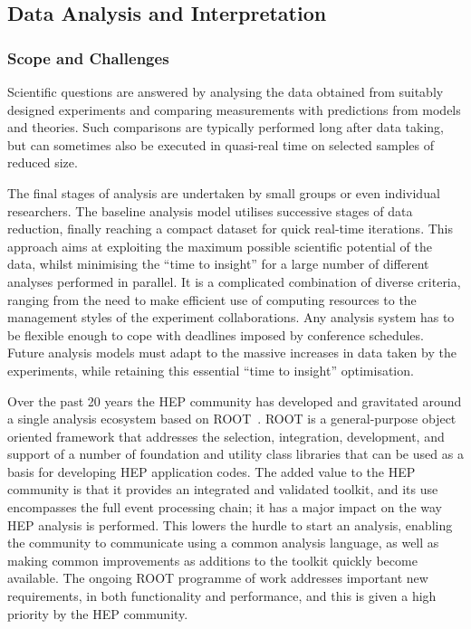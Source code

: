 \documentclass[12pt,a4paper]{article}
\begin{document}
\hypertarget{data-analysis-and-interpretation}{%
\subsection{Data Analysis and
Interpretation}\label{data-analysis-and-interpretation}}

\subsubsection*{Scope and Challenges}

Scientific questions are answered by analysing the data obtained from
suitably designed experiments and comparing measurements with
predictions from models and theories. Such comparisons are typically
performed long after data taking, but can sometimes also be executed in
quasi-real time on selected samples of reduced size.

The final stages of analysis are undertaken by small groups or even
individual researchers. The baseline analysis model utilises successive
stages of data reduction, finally reaching a compact dataset for quick
real-time iterations. This approach aims at exploiting the maximum
possible scientific potential of the data, whilst minimising the ``time
to insight'' for a large number of different analyses performed in
parallel. It is a complicated combination of diverse criteria, ranging
from the need to make efficient use of computing resources to the
management styles of the experiment collaborations. Any analysis system
has to be flexible enough to cope with deadlines imposed by conference
schedules. Future analysis models must adapt to the massive increases in
data taken by the experiments, while retaining this essential ``time to
insight'' optimisation.

Over the past 20 years the HEP community has developed and gravitated
around a single analysis ecosystem based on ROOT~\cite{Brun1996}. 
ROOT is a general-purpose object
oriented framework that addresses the selection, integration,
development, and support of a number of foundation and utility class
libraries that can be used as a basis for developing HEP application
codes. The added value to the HEP community is that it provides an
integrated and validated toolkit, and its use encompasses the full event
processing chain; it has a major impact on the way HEP analysis is
performed. This lowers the hurdle to start an analysis, enabling the
community to communicate using a common analysis language, as well as
making common improvements as additions to the toolkit quickly become
available. The ongoing ROOT programme of work addresses important new
requirements, in both functionality and performance, and this is given
a high priority by the HEP community.
\end{document}
